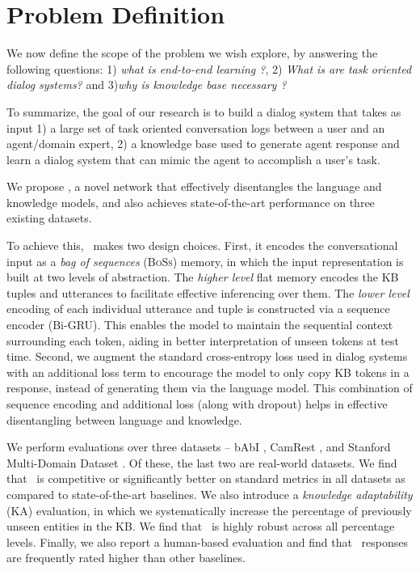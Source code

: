 \section{Problem Definition}
We now define the scope of the problem we wish explore, by answering the following questions: 1) \textit{what is end-to-end learning ?}, 2) \textit{What is are task oriented dialog systems?} and 3)\textit{why is knowledge base necessary ?}



To summarize, the goal of our research is to build a dialog system that takes as input 1) a large set of task oriented conversation logs between a user and an agent/domain expert, 2) a knowledge base used to generate agent response and learn a dialog system that can mimic the agent to accomplish a user's task.  

We propose \sys, a novel network that effectively disentangles the language and knowledge models, and also achieves state-of-the-art performance on three existing datasets.  

To achieve this, \sys\ makes two design choices. First, it encodes the conversational input as a {\em bag of sequences} (\textsc{BoSs}) memory, in which the input representation is built at two levels of abstraction. The \emph{higher level} flat memory encodes the KB tuples and utterances to facilitate effective inferencing over them. The \emph{lower level} encoding of each individual utterance and tuple is constructed via a sequence encoder (Bi-GRU). This enables the model to maintain the sequential context surrounding each token, aiding in better interpretation of unseen tokens at test time. Second, we augment the standard cross-entropy loss used in dialog systems with an additional loss term to encourage the model to only copy KB tokens in a response, instead of generating them via the language model. This combination of sequence encoding and additional loss (along with dropout) helps in effective disentangling between language and knowledge.  

We perform evaluations over three datasets -- bAbI \cite{BordesW16}, CamRest \cite{wenEMNLP2016}, and Stanford Multi-Domain Dataset \cite{Ericsigdial}. Of these, the last two are real-world datasets. We find that \sys\ is competitive or significantly better on standard metrics in all datasets as compared to state-of-the-art baselines. We also introduce a {\em knowledge adaptability} (KA) evaluation, in which we systematically increase the percentage of previously unseen entities in the KB. We find that \sys\ is highly robust across all percentage levels. Finally, we also report a human-based evaluation and find that \sys\ responses are frequently rated higher than other baselines.

